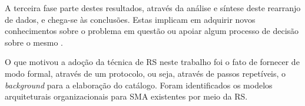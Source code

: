A terceira fase parte destes resultados, através da análise e síntese deste rearranjo de dados, e chega-se às conclusões. Estas implicam em adquirir novos conhecimentos sobre o problema em questão ou apoiar algum processo de decisão sobre o mesmo \cite{biolchini2005}.

O que motivou a adoção da técnica de RS neste trabalho foi o fato de fornecer de modo formal, através de um protocolo, ou seja, através de passos repetíveis, o \textit{background} para a elaboração do catálogo. Foram identificados os modelos arquiteturais organizacionais para SMA existentes por meio da RS.

